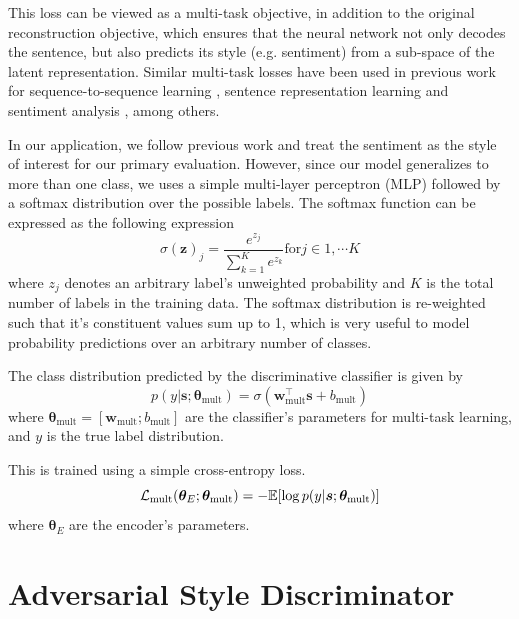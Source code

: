 This loss can be viewed as a multi-task objective, in addition to the original reconstruction objective, which ensures that the neural network not only decodes the sentence, but also predicts its style (e.g. sentiment) from a sub-space of the latent representation. Similar multi-task losses have been used in previous work for sequence-to-sequence learning \citep{luong2015multi}, sentence representation learning \citep{jernite2017discourse} and sentiment analysis \citep{balikas2017multitask}, among others.

In our application, we follow previous work \citep{hu2017toward,shen2017style,fu2017style} and treat the sentiment as the style of interest for our primary evaluation. However, since our model generalizes to more than one class, we uses a simple multi-layer perceptron (MLP) followed by a softmax distribution over the possible labels. The softmax function can be expressed as the following expression
\begin{equation*}
	\sigma(\mathbf{z})_j = \frac{e^{z_j}}{\sum_{k=1}^K e^{z_k}} \text{for} j \in {1, \cdots K}
\end{equation*}
where $z_j$ denotes an arbitrary label's unweighted probability and $K$ is the total number of labels in the training data. The softmax distribution is re-weighted such that it's constituent values sum up to 1, which is very useful to model probability predictions over an arbitrary number of classes.

The class distribution predicted by the discriminative classifier is given by
\begin{equation} \label{eqn:class-pred}
	p(y | \bm s; \bm\theta_\text{mult}) = \sigma(\bm w_\text{mult}^\top \bm s + b_\text{mult})
\end{equation}
where $\bm\theta_\text{mult}=[\bm w_\text{mult}; b_\text{mult}]$ are the classifier's parameters for multi-task learning, and $y$ is the true label distribution.

This is trained using a simple cross-entropy loss.
\begin{equation} \label{eqn:multi-task-loss}
	\mathcal{L}_\text{mult}(\bm\theta_{E};\bm\theta_\text{mult}) =
	- \mathbb{E} [\log p(y | \bm s; \bm\theta_\text{mult})]
\end{equation}
where $\bm\theta_E$ are the encoder's parameters.


\section{Adversarial Style Discriminator} \label{sec:adversarial-style-objective}

